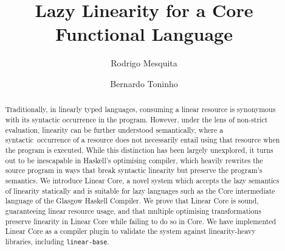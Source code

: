 \documentclass[acmsmall,review,screen]{acmart}
\title{Lazy Linearity for a Core Functional Language}
\author{Rodrigo Mesquita}
\affiliation{
   \institution{Well-Typed LLP}
   \country{United Kingdom}
 }
\author{Bernardo Toninho}
\affiliation{
  \department{Departamento de Engenharia Inform\'{a}tica}
  \institution{Instituto Superior Técnico, Universidade de Lisboa and INESC-ID}
  \country{Portugal}}
\newcommand{\ROUNDTWO}[1]{{\color{red}#1}}
\begin{document}
\begin{abstract}
Traditionally, \ROUNDTWO{in linearly typed languages, consuming} a linear resource is synonymous
with its syntactic occurrence in the program. However, under the lens of
non-strict evaluation, linearity can be further understood semantically,
where a syntactic occurrence of a resource does not necessarily entail
using that resource when the program is executed.
%
\ROUNDTWO{While this distinction has been largely unexplored, it turns
  out to be inescapable in} Haskell's optimising compiler, which heavily rewrites the source
    program in ways that break syntactic linearity but preserve the program's
    semantics.
%
%
%
%
%
%
We introduce Linear Core, \ROUNDTWO{a novel system which accepts the lazy
semantics of linearity statically} and
is suitable for \ROUNDTWO{lazy languages such as } the Core intermediate language of the
Glasgow Haskell Compiler. We prove \ROUNDTWO{that} Linear Core is sound,
\ROUNDTWO{guaranteeing} linear resource usage, and \ROUNDTWO{that} multiple
optimising transformations preserve linearity in Linear Core while failing
to do so in Core. We have implemented Linear Core as a compiler plugin to
validate the system against linearity-heavy libraries, including
\texttt{linear-base}.%
\end{abstract}

\maketitle

\end{document}

